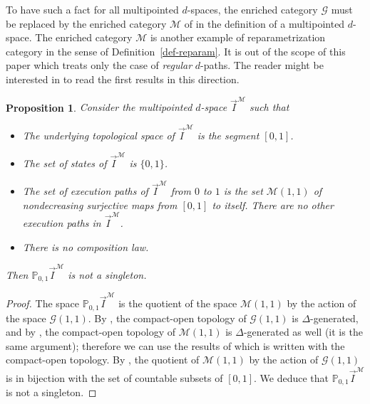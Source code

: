 \documentclass[a4paper,12pt]{amsart}
\renewcommand{\vec}{\overrightarrow}
\renewcommand{\P}{\mathbb{P}}
\newtheorem{prop}[thm]{Proposition}
\newcommand{\bp}{\begin{prop}}
\newcommand{\ep}{\end{prop}}
\newcommand{\bpf}{\begin{proof}}
\newcommand{\epf}{\end{proof}}
\theoremstyle{definition}
\newcommand{\vI}{\vec{I}}
\renewcommand{\P}{\mathbb{P}}
\begin{document}
To have such a fact for all multipointed $d$-spaces, the enriched category $\mathcal{G}$ must be replaced by the enriched category $\mathcal{M}$ of \cite[Proposition~4.11]{Moore1} in the definition of a multipointed $d$-space. The enriched category $\mathcal{M}$ is another example of reparametrization category in the sense of Definition~\ref{def-reparam}. It is out of the scope of this paper which treats only the case of \textit{regular} $d$-paths. The reader might be interested in \cite{Moore3} to read the first results in this direction.

\bp \label{viM}
Consider the multipointed $d$-space $\vI^{\mathcal{M}}$ such that
\begin{itemize}
	\item The underlying topological space of $\vI^{\mathcal{M}}$ is the segment $[0,1]$.
	\item The set of states of $\vI^{\mathcal{M}}$ is $\{0,1\}$.
	\item The set of execution paths of $\vI^{\mathcal{M}}$ from $0$ to $1$ is the set $\mathcal{M}(1,1)$ of nondecreasing surjective maps from $[0,1]$ to itself. There are no other execution paths in $\vI^{\mathcal{M}}$.
	\item There is no composition law.
\end{itemize}
Then $\P_{0,1}\vI^{\mathcal{M}}$ is not a singleton. 
\ep


\bpf
The space $\P_{0,1}\vI^{\mathcal{M}}$ is the quotient of the space $\mathcal{M}(1,1)$ by the action of the space $\mathcal{G}(1,1)$. By \cite[Proposition~2.5]{Moore2}, the compact-open topology of $\mathcal{G}(1,1)$ is $\Delta$-generated, and by \cite[Proposition~2.6]{Moore3}, the compact-open topology of $\mathcal{M}(1,1)$ is $\Delta$-generated as well (it is the same argument); therefore we can use the results of \cite{reparam} which is written with the compact-open topology. By \cite[Proposition~2.22]{reparam}, the quotient of $\mathcal{M}(1,1)$ by the action of $\mathcal{G}(1,1)$ is in bijection with the set of countable subsets of $[0,1]$. We deduce that $\P_{0,1}\vI^{\mathcal{M}}$ is not a singleton.
\epf
\end{document}
